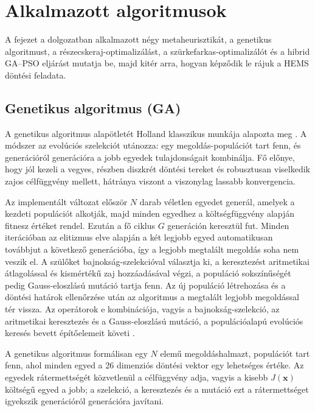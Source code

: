 \chapter{Alkalmazott algoritmusok}\label{ch:ELM}

\begin{osszefoglal}
A fejezet a dolgozatban alkalmazott négy metaheurisztikát, a genetikus algoritmust, a részecskeraj-optimalizálást, a szürkefarkas-optimalizálót és a hibrid GA--PSO eljárást mutatja be, majd kitér arra, hogyan képződik le rájuk a HEMS döntési feladata.
\end{osszefoglal}

\section{Genetikus algoritmus (GA)}
A genetikus algoritmus alapötletét Holland klasszikus munkája alapozta meg \cite{HollandGA1975}. A módszer az evolúciós szelekciót utánozza: egy megoldás-populációt tart fenn, és generációról generációra a jobb egyedek tulajdonságait kombinálja. Fő előnye, hogy jól kezeli a vegyes, részben diszkrét döntési tereket és robusztusan viselkedik zajos célfüggvény mellett, hátránya viszont a viszonylag lassabb konvergencia.

Az implementált változat először $N$ darab véletlen egyedet generál, amelyek a kezdeti populációt alkotják, majd minden egyedhez a költségfüggvény alapján fitnesz értéket rendel. Ezután a fő ciklus $G$ generáción keresztül fut. Minden iterációban az elitizmus elve alapján a két legjobb egyed automatikusan továbbjut a következő generációba, így a legjobb megtalált megoldás soha nem veszik el. A szülőket bajnokság-szelekcióval választja ki, a keresztezést aritmetikai átlagolással és kismértékű zaj hozzáadásával végzi, a populáció sokszínűségét pedig Gauss-eloszlású mutáció tartja fenn. Az új populáció létrehozása és a döntési határok ellenőrzése után az algoritmus a megtalált legjobb megoldással tér vissza. Az operátorok e kombinációja, vagyis a bajnokság-szelekció, az aritmetikai keresztezés és a Gauss-eloszlású mutáció, a populációalapú evolúciós keresés bevett építőelemeit követi \cite{Lazzari2023}.

A genetikus algoritmus formálisan egy $N$ elemű megoldáshalmazt, populációt tart fenn, ahol minden egyed a 26 dimenziós döntési vektor egy lehetséges értéke. Az egyedek rátermettségét közvetlenül a célfüggvény adja, vagyis a kisebb $J(\mathbf{x})$ költségű egyed a jobb; a szelekció, a keresztezés és a mutáció ezt a rátermettséget igyekszik generációról generációra javítani.


